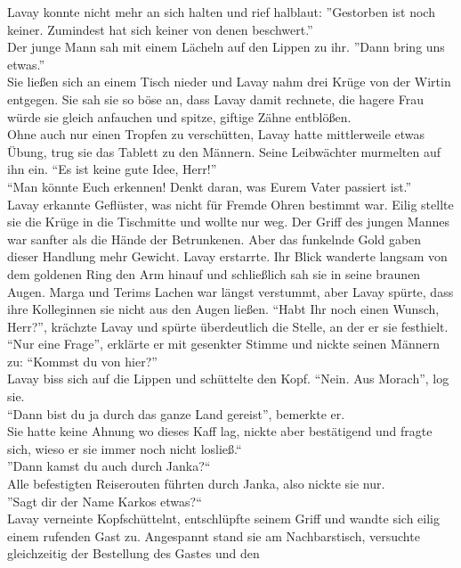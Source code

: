 Lavay konnte nicht mehr an sich halten und rief halblaut: ''Gestorben ist noch keiner. Zumindest 
hat sich keiner von denen beschwert.''\\
Der junge Mann sah mit einem Lächeln auf den Lippen zu ihr. ''Dann bring uns etwas.''\\
Sie ließen sich an einem Tisch nieder und Lavay nahm drei Krüge von der Wirtin entgegen. Sie sah 
sie so böse an, dass Lavay damit rechnete, die hagere Frau würde sie gleich anfauchen und spitze, 
giftige Zähne entblößen.\\
Ohne auch nur einen Tropfen zu verschütten, Lavay hatte mittlerweile etwas Übung, trug sie das 
Tablett zu den Männern. Seine Leibwächter murmelten auf ihn ein. ``Es ist keine gute Idee, 
Herr!''\\
``Man könnte Euch erkennen! Denkt daran, was Eurem Vater passiert ist.''\\
Lavay erkannte Geflüster, was nicht für Fremde Ohren bestimmt war. Eilig stellte sie die Krüge in 
die Tischmitte und wollte nur weg. Der Griff des jungen Mannes war sanfter als die Hände der 
Betrunkenen. Aber das funkelnde Gold gaben dieser Handlung mehr Gewicht. Lavay erstarrte. Ihr Blick 
wanderte langsam von dem goldenen Ring den Arm hinauf und schließlich sah sie in seine braunen 
Augen. Marga und Terims Lachen war längst verstummt, aber Lavay spürte, dass ihre Kolleginnen sie 
nicht aus den Augen ließen. ``Habt Ihr noch einen Wunsch, Herr?'', krächzte Lavay und spürte 
überdeutlich die Stelle, an der er sie festhielt.\\
``Nur eine Frage'', erklärte er mit gesenkter Stimme und nickte seinen Männern zu: ``Kommst du 
von hier?''\\
Lavay biss sich auf die Lippen und schüttelte den Kopf. ``Nein. Aus Morach'', log sie.\\
``Dann bist du ja durch das ganze Land gereist'', bemerkte er.\\
Sie hatte keine Ahnung wo dieses Kaff lag, nickte aber bestätigend und fragte sich, wieso er sie 
immer noch nicht losließ.``\\
''Dann kamst du auch durch Janka?``\\
Alle befestigten Reiserouten führten durch Janka, also nickte sie nur.\\
''Sagt dir der Name Karkos etwas?``\\
Lavay verneinte Kopfschüttelnt, entschlüpfte seinem Griff und wandte sich eilig einem rufenden Gast 
zu. Angespannt stand sie am Nachbarstisch, versuchte gleichzeitig der Bestellung des Gastes und den 
